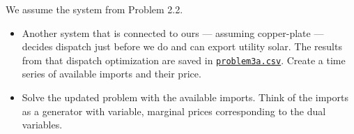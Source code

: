 \documentclass[10pt]{article}
\newenvironment{problem}[2][Problem]{\begin{trivlist}
\item[\hskip \labelsep {\bfseries #1}\hskip \labelsep {\bfseries #2.}]}{\end{trivlist}}
\begin{document}
\begin{problem}{2.3}
	
	We assume the system from Problem 2.2.
	\begin{itemize}
		\item[a)] Another system that is connected to ours --- assuming copper-plate --- decides dispatch just before we do and can export utility solar. The results from that dispatch optimization are saved in \href{problem3a.csv}{\texttt{problem3a.csv}}. Create a time series of available imports and their price.
		\item[b)] Solve the updated problem with the available imports. Think of the imports as a generator with variable, marginal prices corresponding to the dual variables.
	\end{itemize}

\end{problem}

\

\end{document}
